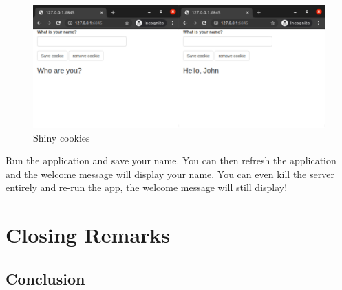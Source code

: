 \documentclass[
]{krantz}
\makeatletter
\newenvironment{Shaded}{\begin{snugshade}}{\end{snugshade}}
\newcommand{\CommentTok}[1]{\textcolor[rgb]{0.37,0.37,0.37}{\textit{#1}}}
\newcommand{\ControlFlowTok}[1]{\textcolor[rgb]{0.27,0.27,0.27}{\textbf{#1}}}
\newcommand{\DataTypeTok}[1]{\textcolor[rgb]{0.27,0.27,0.27}{#1}}
\newcommand{\KeywordTok}[1]{\textcolor[rgb]{0.27,0.27,0.27}{\textbf{#1}}}
\newcommand{\NormalTok}[1]{#1}
\newcommand{\OperatorTok}[1]{\textcolor[rgb]{0.43,0.43,0.43}{\textbf{#1}}}
\newcommand{\StringTok}[1]{\textcolor[rgb]{0.5,0.5,0.5}{#1}}
\newenvironment{kframe}{%
\medskip{}
\setlength{\fboxsep}{.8em}
 \def\at@end@of@kframe{}%
 \ifinner\ifhmode%
  \def\at@end@of@kframe{\end{minipage}}%
  \begin{minipage}{\columnwidth}%
 \fi\fi%
 \def\FrameCommand##1{\hskip\@totalleftmargin \hskip-\fboxsep
 \colorbox{shadecolor}{##1}\hskip-\fboxsep
     \hskip-\linewidth \hskip-\@totalleftmargin \hskip\columnwidth}%
 \MakeFramed {\advance\hsize-\width
   \@totalleftmargin\z@ \linewidth\hsize
   \@setminipage}}%
 {\par\unskip\endMakeFramed%
 \at@end@of@kframe}
\renewenvironment{Shaded}{\begin{kframe}}{\end{kframe}}
\makeatother
\begin{document}
\begin{Shaded}
\end{Shaded}

\begin{figure}
\centering
\includegraphics{images/shiny-cookies-2.png}
\caption{Shiny cookies}
\end{figure}

Run the application and save your name. You can then refresh the application and the welcome message will display your name. You can even kill the server entirely and re-run the app, the welcome message will still display!

\hypertarget{part-closing-remarks}{%
\part{Closing Remarks}\label{part-closing-remarks}}

\hypertarget{conclusion}{%
\chapter{Conclusion}\label{conclusion}}
\end{document}

